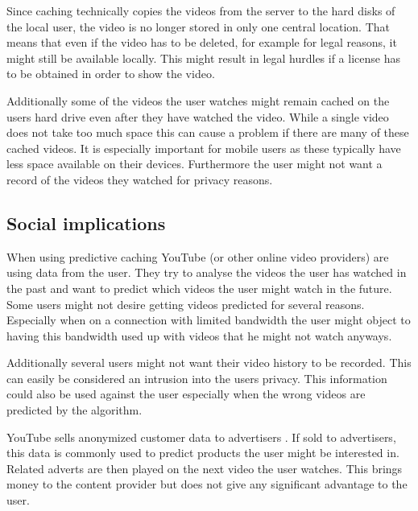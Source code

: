 Since caching technically copies the videos from the server to the hard disks of the local user, the video is no longer stored in only one central location. That means that even if the video has to be deleted, for example for legal reasons, it might still be available locally. This might result in legal hurdles if a license has to be obtained in order to show the video.

Additionally some of the videos the user watches might remain cached on the users hard drive even after they have watched the video. While a single video does not take too much space this can cause a problem if there are many of these cached videos. It is especially important for mobile users as these typically have less space available on their devices. Furthermore the user might not want a record of the videos they watched for privacy reasons.

\subsection{Social implications}
When using predictive caching YouTube (or other online video providers) are using data from the user. They try to analyse the videos the user has watched in the past and want to predict which videos the user might watch in the future. Some users might not desire getting videos predicted for several reasons. Especially when on a connection with limited bandwidth the user might object to having this bandwidth used up with videos that he might not watch anyways.

Additionally several users might not want their video history to be recorded. This can easily be considered an intrusion into the users privacy. This information could also be used against the user  especially when the wrong videos are predicted by the algorithm.

YouTube sells anonymized customer data to advertisers . If sold to advertisers, this data is commonly used to predict products the user might be interested in. Related adverts are then played on the next video the user watches. This brings money to the content provider but does not give any significant advantage to the user.
